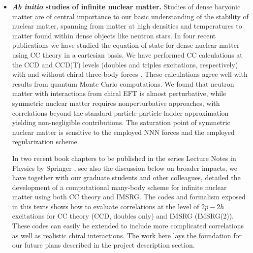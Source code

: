 \begin{itemize}
\item {\bf \emph{Ab initio} studies of infinite nuclear matter.}
  Studies of dense baryonic matter are of central importance to our
  basic understanding of the stability of nuclear matter, spanning
  from matter at high densities and temperatures to matter found
  within dense objects like neutron stars. In four recent publications we have studied the equation
  of state for dense nuclear matter using CC theory in a
  cartesian basis. We have performed CC calculations at the CCD and CCD(T) levels (doubles and triples excitations, respectively) with and
  without chiral three-body forces
  \cite{Baardsen:2013vwa,Hagen:2013yba}.  These calculations agree
  well with results from quantum Monte Carlo computations. We found that
  neutron matter with interactions from chiral EFT is almost perturbative,
  while symmetric nuclear matter requires nonperturbative
  approaches, with correlations beyond the standard particle-particle
  ladder approximation yielding non-negligible contributions. The
  saturation point of symmetric nuclear matter is sensitive to the
  employed NNN forces and the employed regularization scheme.

  In two recent book chapters to be published in the series Lecture
  Notes in Physics by Springer \cite{lnp}, see also the discussion
  below on broader impacts, we have together with our graduate students
  and other colleagues, detailed the development of a
  computational many-body scheme for infinite nuclear matter using
  both CC theory and IMSRG. The codes and formalism exposed in this
  texts shows how to evaluate correlations at the level of $2p-2h$
  excitations for CC theory (CCD, doubles only) and IMSRG (IMSRG(2)). These codes can easily be
  extended to include more complicated correlations as well as
  realistic chiral interactions. The work here lays the foundation for
  our future plans described in the project description section.



\end{itemize}

